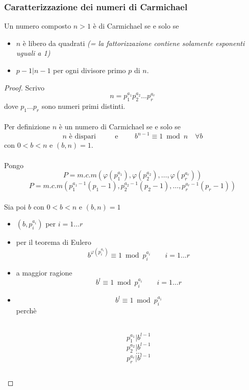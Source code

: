 \documentclass[a4paper,12pt, oneside]{book}
\begin{document}
			\subsubsection[Caratterizzazione]{Caratterizzazione dei numeri di Carmichael}
			Un numero composto $n>1$ è di Carmichael se e solo se
			\begin{itemize}
				\item $n$ è libero da quadrati \textit{(= la fattorizzazione contiene solamente esponenti uguali a 1)}
				\item $p-1|n-1$ per ogni divisore primo $p$ di $n$.
			\end{itemize}
			
			\begin{proof}
				Scrivo $$n = p_{1}^{a_1} p_{2}^{a_2} \dots p_{r}^{a_r}$$
				dove $p_1 \dots p_r$ sono numeri primi distinti.\\\\
				Per definizione $n$ è un numero di Carmichael se e solo se
				$$n\mbox{ è dispari } \qquad \mbox{ e } \qquad b^{n-1} \equiv 1 \bmod n \quad \forall b $$
				con $0<b<n$ e $(b,n)=1$.\\\\
				Pongo
				$$P = m.c.m( \varphi(p_{1}^{a_1}), \varphi(p_{2}^{a_2}), \dots, \varphi(p_{r}^{a_r}) )$$
				$$P = m.c.m( p_{1}^{a_{1}-1}(p_{1}-1), p_{2}^{a_{2}-1}(p_{2}-1), \dots, p_{r}^{a_{r}-1}(p_{r}-1) )$$\\
				Sia poi $b$ con $0<b<n$ e $(b,n)=1$
				\begin{itemize}
					\item $(b, p_{i}^{a_i})$ per $i = 1 \dots r$
					\item per il teorema di Eulero $$b^{\varphi(p_{i}^{a_i})} \equiv 1 \bmod p_{i}^{a_i} \qquad i=1 \dots r$$
					\item a maggior ragione $$b^{l} \equiv 1 \bmod p_{i}^{a_i} \qquad i=1 \dots r$$
					\item $$b^{l} \equiv 1 \bmod p_{i}^{a_i}$$ perchè\\\\
					
						\begin{minipage}{0.45\textwidth}
							
							$$p_{1}^{a_1} | b^{l-1}$$
							$$p_{2}^{a_2} | b^{l-1}$$
							$$\dots$$
							$$p_{r}^{a_r} | b^{l-1}$$
							
						\end{minipage}%
						\hfill
						\begin{minipage}{0.45\textwidth}
							\begin{tabular}{|p{\textwidth}}
								

\end{tabular}
\end{minipage}
\end{itemize}
\end{proof}
\end{document}
